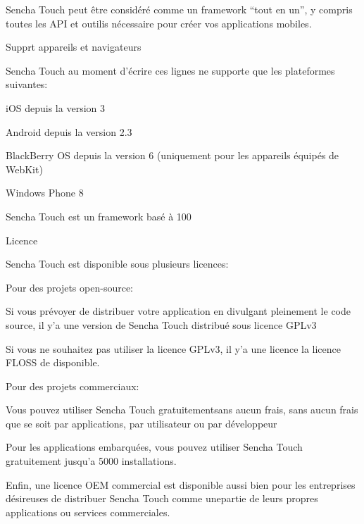 Sencha Touch peut être considéré comme un framework “tout en un”, y compris toutes les API et outilis nécessaire pour créer vos applications mobiles.

Supprt appareils et navigateurs

Sencha Touch au moment d’écrire ces lignes ne supporte que les plateformes suivantes:

    iOS depuis la version 3

    Android depuis la version 2.3

    BlackBerry OS depuis la version 6 (uniquement pour les appareils équipés de WebKit)

    Windows Phone 8

Sencha Touch est un framework basé à 100%


Licence

Sencha Touch est disponible sous plusieurs licences:

Pour des projets open-source:

    Si vous prévoyer de distribuer votre application en divulgant pleinement le code source, il y’a une version de Sencha Touch distribué sous licence GPLv3

    Si vous ne souhaitez pas utiliser la licence GPLv3, il y’a une licence la  licence FLOSS de disponible.


Pour des projets commerciaux:

    Vous pouvez utiliser Sencha Touch gratuitementsans aucun frais, sans aucun frais que se soit par applications, par utilisateur ou par développeur

    Pour les applications embarquées, vous pouvez utiliser Sencha Touch gratuitement jusqu’a 5000 installations.

    Enfin, une licence OEM commercial est disponible aussi bien pour les entreprises désireuses de distribuer Sencha Touch comme unepartie de leurs propres applications ou services commerciales.



